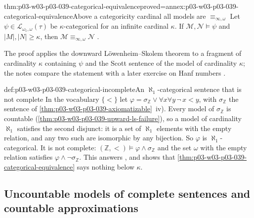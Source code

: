 \begin{hbtheorem}{thm:p03-w03-p03-039-categorical-equivalence}{proved=annex:p03-w03-p03-039-categorical-equivalence}{Above a categoricity cardinal all models are \(\equiv_{\infty,\omega}\)}
Let \(\psi\in\mathcal L_{\omega_1,\omega}(\tau)\) be \(\kappa\)-categorical for
an infinite cardinal \(\kappa\). If \(\mathcal M,\mathcal N\models\psi\) and
\(\lvert M\rvert,\lvert N\rvert\ge\kappa\), then
\(\mathcal M\equiv_{\infty,\omega}\mathcal N\)
\cite[Ex.~2.29, p.~21]{Marker2014InfinitaryNotes}.
\end{hbtheorem}

The proof applies the downward L\"owenheim--Skolem theorem to a fragment of
cardinality \(\kappa\) containing \(\psi\) and the Scott sentence of the model
of cardinality \(\kappa\); the notes compare the statement with a later
exercise on Hanf numbers \cite[Ex.~2.29, p.~21]{Marker2014InfinitaryNotes}.

\begin{hbexample}{def:p03-w03-p03-039-categorical-incomplete}{An \(\aleph_1\)-categorical sentence that is not complete}
In the vocabulary \(\{<\}\) let
\(\varphi=\sigma_{\mathbb Z}\vee\forall x\forall y\,\neg\,x<y\), with
\(\sigma_{\mathbb Z}\) the sentence of
\cref{thm:p03-w03-p03-039-axiomatizable}~iv). Every model of
\(\sigma_{\mathbb Z}\) is countable
(\cref{thm:p03-w03-p03-039-upward-ls-failure}), so a model of cardinality
\(\aleph_1\) satisfies the second disjunct: it is a set of \(\aleph_1\)
elements with the empty relation, and any two such are isomorphic by any
bijection. So \(\varphi\) is \(\aleph_1\)-categorical. It is not complete:
\((\mathbb Z,<)\models\varphi\wedge\sigma_{\mathbb Z}\) and the set \(\omega\)
with the empty relation satisfies \(\varphi\wedge\neg\sigma_{\mathbb Z}\). This
answers \cite[Ex.~2.30, p.~21]{Marker2014InfinitaryNotes}, and shows that
\cref{thm:p03-w03-p03-039-categorical-equivalence} says nothing below
\(\kappa\).
\end{hbexample}

\subsection{Uncountable models of complete sentences and countable approximations}
\label{sec:p03-w03-p03-039-approximations}

